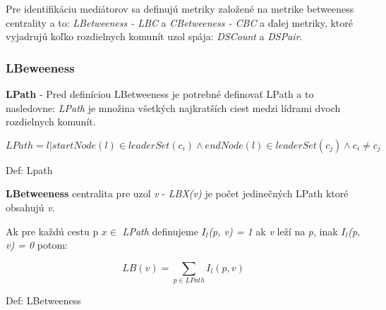 \documentclass[slovak,master,public,dept460,male,cpdeclaration,oneside]{diploma}
\begin{document}
Pre identifikáciu mediátorov sa definujú metriky založené na metrike betweeness centrality a to:  \textit{LBetweeness - LBC} a \textit{CBetweeness - CBC} a ďalej metriky, ktoré vyjadrujú koľko rozdielnych komunít uzol spája: \textit{DSCount} a \textit{DSPair}.


\subsubsection{LBeweeness}


\textbf{LPath} - Pred definíciou LBetweeness je potrebné definovať LPath a to nasledovne: \textit{LPath} je množina všetkých najkratších ciest medzi lídrami dvoch rozdielnych komunít. 


\begin{mycapequ}[!ht]
   \begin{equation*}
     LPath = { l|startNode(l) \in  leaderSet(c_{i})\wedge endNode(l) \in leaderSet(c_{j}) \wedge c_{i}\neq c_{j} }
   \end{equation*}
   \caption{Def: Lpath}
\end{mycapequ}



{\setlength{\parindent}{0cm}
\begin{sloppypar}
\textbf{LBetweeness} centralita pre uzol \textit{v} - \textit{LBX(v)} je počet jedinečných LPath ktoré obsahujú \textit{v}. 


Ak pre každú cestu p  ${x \in}$ \textit{LPath} definujeme \textit{${I_l}$(p, v) = 1} ak \textit{v} leží na \textit{p}, inak \textit{${I_l}$(p, v) = 0} potom:
\end{sloppypar}
}
 
\begin{mycapequ}[!ht]
   \begin{equation*}
     LB(v) = \sum_{p \in LPath} I_{l}(p, v)
   \end{equation*}
   \caption{Def: LBetweeness}
\end{mycapequ}
\end{document}
